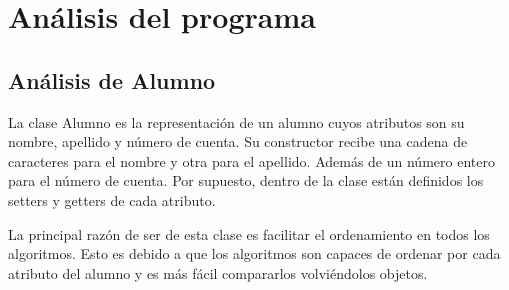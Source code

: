 \documentclass[11pt]{article}
\begin{document}
\section{Análisis del programa}
\subsection{Análisis de Alumno}
La clase Alumno es la representación de un alumno cuyos atributos son su nombre, apellido y número de cuenta. Su constructor recibe una cadena de caracteres para el nombre y otra para el apellido. Además de un número entero para el número de cuenta. Por supuesto, dentro de la clase están definidos los setters y getters de cada atributo.
\par
La principal razón de ser de esta clase es facilitar el ordenamiento en todos los algoritmos. Esto es debido a que los algoritmos son capaces de ordenar por cada atributo del alumno y es más fácil compararlos volviéndolos objetos.
\end{document}
